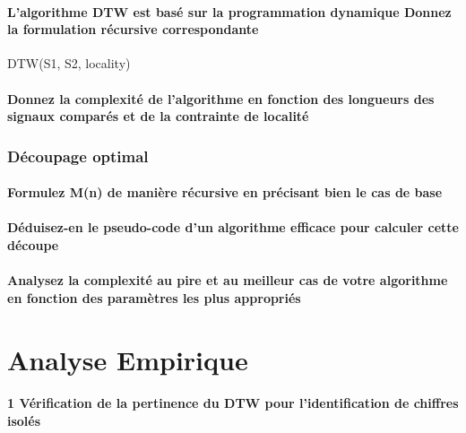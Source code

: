 \documentclass[a4paper,11pt]{article}
\begin{document}
\subsection{L'algorithme DTW est basé sur la programmation dynamique Donnez la formulation récursive correspondante}

DTW(S1, S2, locality)

\subsection{Donnez la complexité de l'algorithme en fonction des longueurs des signaux comparés et de la contrainte de localité}



\section{Découpage optimal}

\subsection{Formulez M(n) de manière récursive en précisant bien le cas de base}

\subsection{Déduisez-en le pseudo-code d'un algorithme efficace pour calculer cette découpe}

\subsection{Analysez la complexité au pire et au meilleur cas de votre algorithme en fonction des paramètres les plus appropriés}

\part{Analyse Empirique}

\subsection*{1 Vérification de la pertinence du DTW pour l'identification de chiffres isolés}

\label{tableau}
\end{document}

